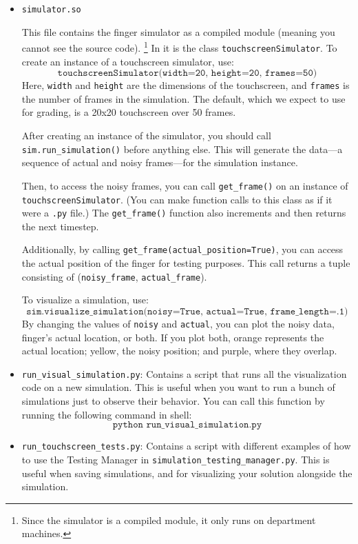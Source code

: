 \documentclass{article}
\begin{document}
\begin{itemize}
\item \texttt{simulator.so}

  This file contains the finger simulator as a compiled module (meaning you cannot see the source code).%
  \footnote{Since the simulator is a compiled module, it only runs on department machines.}  
  In it is the class \texttt{touchscreenSimulator}.
  To create an instance of a touchscreen simulator, use:
  $$\texttt{touchscreenSimulator(width=20, height=20, frames=50)}$$
  Here, \texttt{width} and \texttt{height} are the dimensions of the touchscreen,
  and \texttt{frames} is the number of frames in the simulation.
  The default, which we expect to use for grading, is a 20x20 touchscreen over 50 frames.
        
  After creating an instance of the simulator, you should call \texttt{sim.run\_simulation()} before anything else.
  This will generate the data---a sequence of actual and noisy frames---for the simulation instance.
  
  Then, to access the noisy frames,
  you can call \texttt{get\_frame()} on an instance of \texttt{touchscreenSimulator}.
  (You can make function calls to this class as if it were a \texttt{.py} file.)
  The \texttt{get\_frame()} function also increments and then returns the next timestep.

  Additionally, by calling \texttt{get\_frame(actual\_position=True)},
  you can access the actual position of the finger for testing purposes.
  This call returns a tuple consisting of (\texttt{noisy\_frame}, \texttt{actual\_frame}).

  To visualize a simulation, use:
  $$\texttt{sim.visualize\_simulation(noisy=True, actual=True, frame\_length=.1)}$$
  By changing the values of \texttt{noisy} and \texttt{actual},
  you can plot the noisy data, finger's actual location, or both.
  If you plot both, orange represents the actual location;
  yellow, the noisy position; and purple, where they overlap.

\item \texttt{run\_visual\_simulation.py}:
  Contains a script that runs all the visualization code on a new simulation.
  This is useful when you want to run a bunch of simulations just to observe their behavior.
  You can call this function by running the following command in shell:
  $$\texttt{python run\_visual\_simulation.py}$$
  
\item \texttt{run\_touchscreen\_tests.py}:
  Contains a script with different examples of how to use the Testing Manager in \texttt{simulation\_testing\_manager.py}.
  This is useful when saving simulations, and for visualizing your solution alongside the simulation.


\end{itemize}
\end{document}
